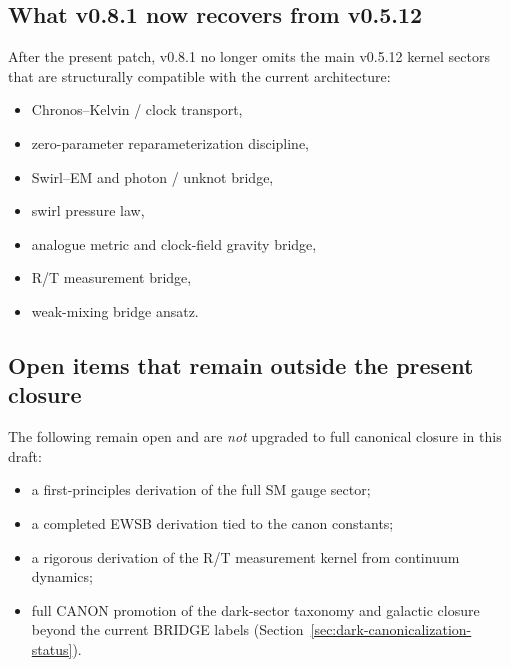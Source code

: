 \documentclass[11pt]{article}
\theoremstyle{definition}
\theoremstyle{plain}
\theoremstyle{remark}
\begin{document}
    \subsection{What v0.8.1 now recovers from v0.5.12}

        After the present patch, v0.8.1 no longer omits the main v0.5.12 kernel sectors that are structurally compatible with the current architecture:
        \begin{itemize}
            \item Chronos--Kelvin / clock transport,
            \item zero-parameter reparameterization discipline,
            \item Swirl--EM and photon / unknot bridge,
            \item swirl pressure law,
            \item analogue metric and clock-field gravity bridge,
            \item R/T measurement bridge,
            \item weak-mixing bridge ansatz.
        \end{itemize}

    \subsection{Open items that remain outside the present closure}

        The following remain open and are \emph{not} upgraded to full canonical closure in this draft:
        \begin{itemize}
            \item a first-principles derivation of the full SM gauge sector;
            \item a completed EWSB derivation tied to the canon constants;
            \item a rigorous derivation of the R/T measurement kernel from continuum dynamics;
            \item full CANON promotion of the dark-sector taxonomy and galactic closure beyond the current BRIDGE labels (Section~\ref{sec:dark-canonicalization-status}).
        \end{itemize}
\end{document}
